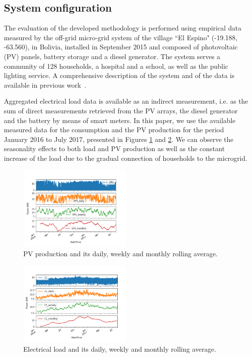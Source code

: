 \documentclass{article}
\begin{document}
\subsection{System configuration}\label{sec: config}

The evaluation of the developed methodology is performed using empirical data measured by the off-grid micro-grid system of the village ``El Espino" (-19.188, -63.560), in Bolivia, installed in September 2015 and composed of photovoltaic (PV) panels, battery storage and a diesel generator. The system serves a community of 128 households, a hospital and a school, as well as the public lighting service. A comprehensive description of the system and of the data is available in previous work~\cite{Balderrama2019}. 

Aggregated electrical load data is available as an indirect measurement, i.e. as the sum of direct measurements retrieved from the PV arrays, the diesel generator and the battery by means of smart meters. In this paper, we use the available measured data for the consumption and the PV production for the period January 2016 to July 2017, presented in Figures \ref{fig:PV} and \ref{fig:load}. We can observe the seasonality effects to both load and PV production as well as the constant increase of the load due to the gradual connection of households to the microgrid.

\begin{figure}[t]
	\includegraphics[width=0.5\textwidth]{PV_new.png}
	\centering
	\caption{PV production and its daily, weekly and monthly rolling average.}
	\label{fig:PV}
\end{figure}

\begin{figure}[t]
	\includegraphics[width=0.5\textwidth]{Load_new.png}
	\centering
	\caption{Electrical load and its daily, weekly and monthly rolling average.}
	\label{fig:load}
\end{figure}
\end{document}
